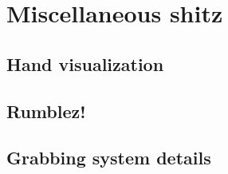 \section{Miscellaneous shitz}
\label{sec:MISCELLANEOUSSHITZ}

\subsection{Hand visualization}
\label{subsec:handVisualization}

\subsection{Rumblez!}
\label{subsec:RUMLBEZ}

\subsection{Grabbing system details}
\label{subsec:grabbingSystem}